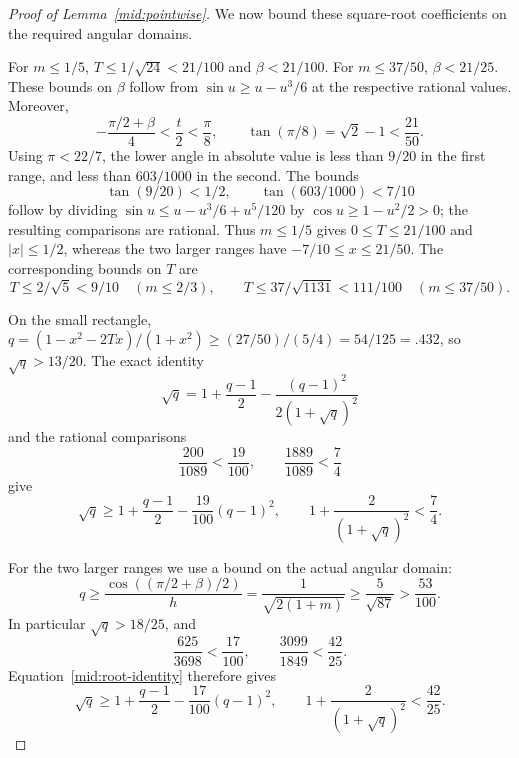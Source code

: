 \begin{proof}[Proof of Lemma~\ref{mid:pointwise}]
We now bound these square-root coefficients on the required angular domains.

For \(m\le1/5\), \(T\le1/\sqrt{24}<21/100\) and
\(\beta<21/100\). For \(m\le37/50\), \(\beta<21/25\).
These bounds on \(\beta\) follow from \(\sin u\ge u-u^3/6\)
at the respective rational values. Moreover,
\[
 -\frac{\pi/2+\beta}{4}<\frac t2
 <\frac{\pi}{8},\qquad \tan(\pi/8)=\sqrt2-1<\frac{21}{50}.
\]
Using \(\pi<22/7\), the lower angle in absolute value is less than
\(9/20\) in the first range, and less than \(603/1000\) in the
second. The bounds
\[
 \tan(9/20)<1/2,\qquad \tan(603/1000)<7/10
\]
follow by dividing
\(\sin u\le u-u^3/6+u^5/120\) by
\(\cos u\ge1-u^2/2>0\); the resulting comparisons are rational.
Thus \(m\le1/5\) gives \(0\le T\le21/100\) and \(|x|\le1/2\),
whereas the two larger ranges have \(-7/10\le x\le21/50\).
The corresponding bounds on \(T\) are
\[
 T\le2/\sqrt5<9/10\quad(m\le2/3),\qquad
 T\le37/\sqrt{1131}<111/100\quad(m\le37/50).
\]

On the small rectangle,
\(q=(1-x^2-2Tx)/(1+x^2)\ge(27/50)/(5/4)=54/125=.432\),
so \(\sqrt q>13/20\). The exact identity
\begin{equation}\label{mid:root-identity}
 \sqrt q=1+\frac{q-1}{2}
          -\frac{(q-1)^2}{2(1+\sqrt q)^2}
\end{equation}
and the rational comparisons
\[
 \frac{200}{1089}<\frac{19}{100},\qquad
 \frac{1889}{1089}<\frac74
\]
give
\[
 \sqrt q\ge1+\frac{q-1}{2}-\frac{19}{100}(q-1)^2,
 \qquad 1+\frac2{(1+\sqrt q)^2}<\frac74.
\]

For the two larger ranges we use a bound on the actual angular domain:
\[
 q\ge\frac{\cos((\pi/2+\beta)/2)}h
   =\frac1{\sqrt{2(1+m)}}
   \ge\frac5{\sqrt{87}}>\frac{53}{100}.
\]
In particular \(\sqrt q>18/25\), and
\[
 \frac{625}{3698}<\frac{17}{100},\qquad
 \frac{3099}{1849}<\frac{42}{25}.
\]
Equation~\eqref{mid:root-identity} therefore gives
\[
 \sqrt q\ge1+\frac{q-1}{2}-\frac{17}{100}(q-1)^2,
 \qquad 1+\frac2{(1+\sqrt q)^2}<\frac{42}{25}.
\]


\end{proof}
